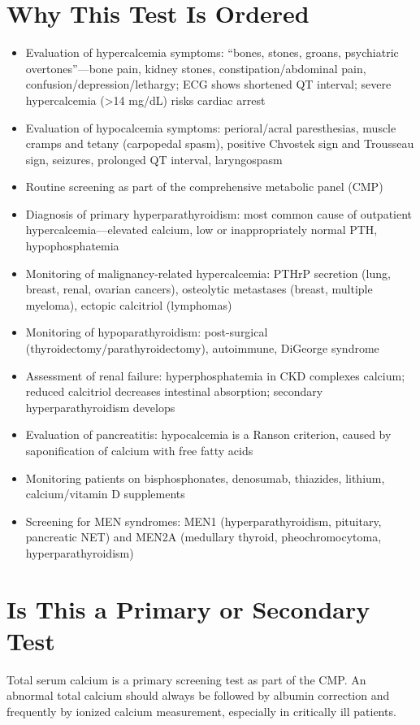\section*{Why This Test Is Ordered}
\begin{itemize}
  \item Evaluation of hypercalcemia symptoms: ``bones, stones, groans, psychiatric overtones''---bone pain, kidney stones, constipation/abdominal pain, confusion/depression/lethargy; ECG shows shortened QT interval; severe hypercalcemia (>14 mg/dL) risks cardiac arrest
  \item Evaluation of hypocalcemia symptoms: perioral/acral paresthesias, muscle cramps and tetany (carpopedal spasm), positive Chvostek sign and Trousseau sign, seizures, prolonged QT interval, laryngospasm
  \item Routine screening as part of the comprehensive metabolic panel (CMP)
  \item Diagnosis of primary hyperparathyroidism: most common cause of outpatient hypercalcemia---elevated calcium, low or inappropriately normal PTH, hypophosphatemia
  \item Monitoring of malignancy-related hypercalcemia: PTHrP secretion (lung, breast, renal, ovarian cancers), osteolytic metastases (breast, multiple myeloma), ectopic calcitriol (lymphomas)
  \item Monitoring of hypoparathyroidism: post-surgical (thyroidectomy/parathyroidectomy), autoimmune, DiGeorge syndrome
  \item Assessment of renal failure: hyperphosphatemia in CKD complexes calcium; reduced calcitriol decreases intestinal absorption; secondary hyperparathyroidism develops
  \item Evaluation of pancreatitis: hypocalcemia is a Ranson criterion, caused by saponification of calcium with free fatty acids
  \item Monitoring patients on bisphosphonates, denosumab, thiazides, lithium, calcium/vitamin D supplements
  \item Screening for MEN syndromes: MEN1 (hyperparathyroidism, pituitary, pancreatic NET) and MEN2A (medullary thyroid, pheochromocytoma, hyperparathyroidism)
\end{itemize}

\section*{Is This a Primary or Secondary Test}
Total serum calcium is a primary screening test as part of the CMP. An abnormal total calcium should always be followed by albumin correction and frequently by ionized calcium measurement, especially in critically ill patients.


